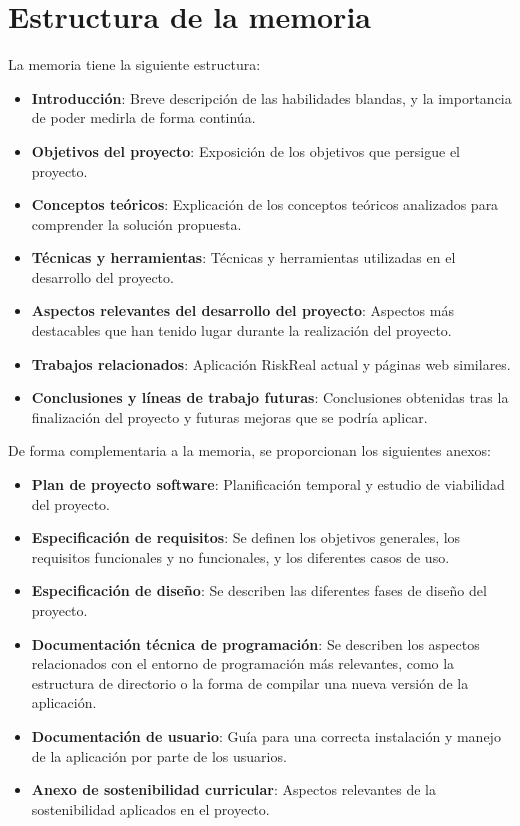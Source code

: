 \section{Estructura de la memoria}

La memoria tiene la siguiente estructura:

\begin{itemize}
	\item \textbf{Introducción}: Breve descripción de las habilidades blandas, y la importancia de poder medirla de forma continúa.
	\item \textbf{Objetivos del proyecto}: Exposición de los objetivos que persigue el proyecto.
	\item \textbf{Conceptos teóricos}: Explicación de los conceptos teóricos analizados para comprender la solución propuesta.
	\item \textbf{Técnicas y herramientas}: Técnicas y herramientas utilizadas en el desarrollo del proyecto.
	\item \textbf{Aspectos relevantes del desarrollo del proyecto}: Aspectos más destacables que han tenido lugar durante la realización del proyecto.
	\item \textbf{Trabajos relacionados}: Aplicación RiskReal\cite{web:riskreal} actual y páginas web similares.
	\item \textbf{Conclusiones y líneas de trabajo futuras}: Conclusiones obtenidas tras la finalización del proyecto y futuras mejoras que se podría aplicar.
\end{itemize}

De forma complementaria a la memoria, se proporcionan los siguientes anexos:

\begin{itemize}
	\item \textbf{Plan de proyecto software}: Planificación temporal y estudio de viabilidad del proyecto.
	\item \textbf{Especificación de requisitos}: Se definen los objetivos generales, los requisitos funcionales y no funcionales, y los diferentes casos de uso. 
	\item \textbf{Especificación de diseño}: Se describen las diferentes fases de diseño del proyecto.
	\item \textbf{Documentación técnica de programación}: Se describen los aspectos relacionados con el entorno de programación más relevantes, como la estructura de directorio o la forma de compilar una nueva versión de la aplicación.
	\item \textbf{Documentación de usuario}: Guía para una correcta instalación y manejo de la aplicación por parte de los usuarios.
	\item \textbf{Anexo de sostenibilidad curricular}: Aspectos relevantes de la sostenibilidad aplicados en el proyecto.
\end{itemize}

